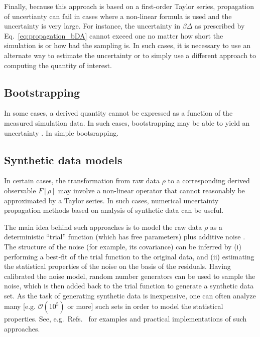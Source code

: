 Finally, because this approach is based on a first-order Taylor series, propagation of uncertianty can fail in cases where a non-linear formula is used and the uncertainty is very large.  For instance, the uncertainty in $\beta \Delta$ as prescribed by Eq.~\ref{eq:propagation_bDA} cannot exceed one no matter how short the simulation is or how bad the sampling is.  In such cases, it is necessary to use an alternate way to estimate the uncertainty or to simply use a different approach to computing the quantity of interest.


\subsection{Bootstrapping}

In some cases, a derived quantity cannot be expressed as a function of the measured simulation data.  In such cases, bootstrapping may be able to yield an uncertainty \cite{EfronTibshiraniBootstrap}.  In simple bootsrapping.

\subsection{Synthetic data models}
 
In certain cases, the transformation from raw data $\rho$ to a corresponding derived observable $F[\rho]$ may involve a non-linear operator that cannot reasonably be approximated by a Taylor series.  In such cases, numerical uncertainty propagation methods based on analysis of synthetic data can be useful.  

The main idea behind such approaches is to model the raw data $\rho$ as a deterministic ``trial'' function (which has free parameters) plus additive noise \cite{patrone1,patrone2,patrone3}.  The structure of the noise (for example, its covariance) can be inferred by (i) performing a best-fit of the trial function to the original data, and (ii) estimating the statistical properties of the noise on the basis of the residuals.  Having calibrated the noise model, random number generators can be used to sample the noise, which is then added back to the trial function to generate a synthetic data set.  As the task of generating synthetic data is inexpensive, one can often analyze many [e.g. $\mathcal O(10^5)$ or more] such sets in order to model the statistical properties.  See, e.g.\ Refs.~\cite{patrone1,patrone2,patrone3} for examples and practical implementations of such approaches.  


